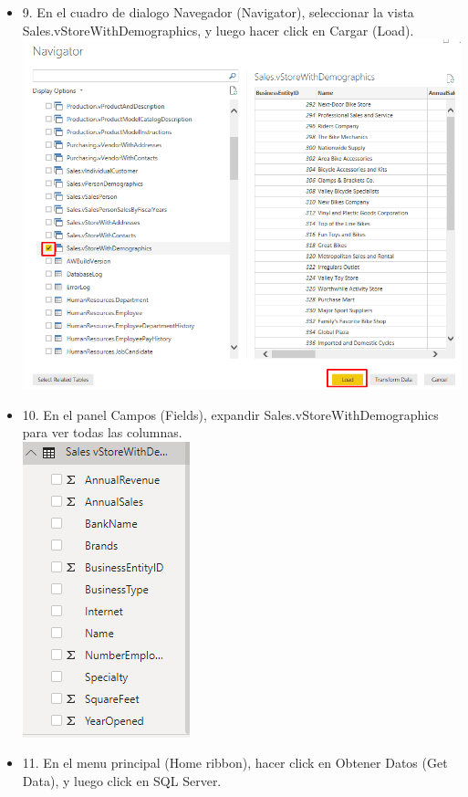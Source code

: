 \begin{itemize}
\item 9. En el cuadro de dialogo Navegador (Navigator), seleccionar la vista Sales.vStoreWithDemographics, y luego
hacer click en Cargar (Load). \\
\includegraphics[scale=0.5]{./Imagenes/image008}
\item 10. En el panel Campos (Fields), expandir Sales.vStoreWithDemographics para ver todas las columnas. \\
\includegraphics[scale=0.5]{./Imagenes/image009}
\item 11. En el menu principal (Home ribbon), hacer click en Obtener Datos (Get Data), y luego click en SQL Server. \\

\end{itemize}
